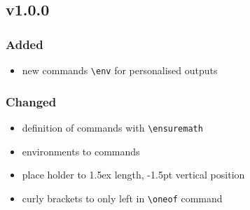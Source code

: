 \documentclass[a4paper]{article}
\begin{document}
\subsection*{v1.0.0}
\subsubsection*{Added}
\begin{itemize}
\item new commands \verb|\env| for personalised outputs
\end{itemize}

\subsubsection*{Changed}
\begin{itemize}
\item definition of commands with \verb|\ensuremath|
\item environments to commands
\item place holder to 1.5ex length, -1.5pt vertical position
\item curly brackets to only left in \verb|\oneof| command
\end{itemize}
\end{document}
